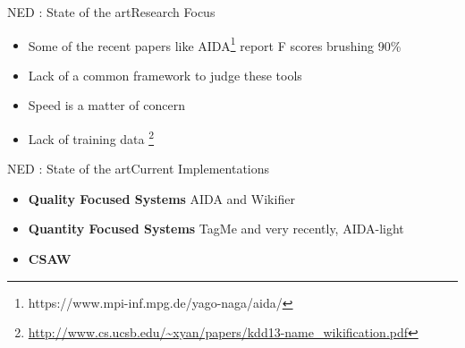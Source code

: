 \documentclass{beamer}
\begin{document}
\begin{frame}{NED : State of the art}{Research Focus}
 \begin{itemize}
  \item Some of the recent papers like AIDA\footnote{https://www.mpi-inf.mpg.de/yago-naga/aida/} report F scores brushing 90\% \medskip
  \item Lack of a common framework to judge these tools   \medskip
  \item Speed is a matter of concern \medskip
  \item Lack of training data \footnote{\url{http://www.cs.ucsb.edu/~xyan/papers/kdd13-name_wikification.pdf}} \medskip
 \end{itemize}
\end{frame}

\begin{frame}{NED : State of the art}{Current Implementations}
 \begin{itemize}
  \item \textbf{Quality Focused Systems} AIDA and Wikifier \medskip
  \item \textbf{Quantity Focused Systems} TagMe and very recently, AIDA-light \medskip
  \item \textbf{CSAW}
 \end{itemize}

\end{frame}
\end{document}
